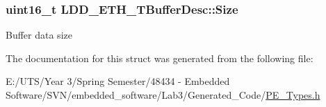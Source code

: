 \subsubsection[{Size}]{\setlength{\rightskip}{0pt plus 5cm}uint16\+\_\+t L\+D\+D\+\_\+\+E\+T\+H\+\_\+\+T\+Buffer\+Desc\+::\+Size}\label{struct_l_d_d___e_t_h___t_buffer_desc_abddc4273b732d3cf44ff0b6870d6b87a}
Buffer data size 

The documentation for this struct was generated from the following file\+:\begin{DoxyCompactItemize}
\item 
E\+:/\+U\+T\+S/\+Year 3/\+Spring Semester/48434 -\/ Embedded Software/\+S\+V\+N/embedded\+\_\+software/\+Lab3/\+Generated\+\_\+\+Code/\hyperlink{_p_e___types_8h}{P\+E\+\_\+\+Types.\+h}\end{DoxyCompactItemize}
